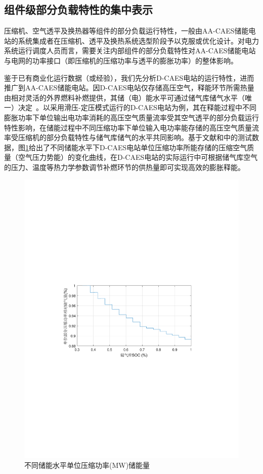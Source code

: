 \subsection{组件级部分负载特性的集中表示}
压缩机、空气透平及换热器等组件的部分负载运行特性，一般由AA-CAES储能电站的系统集成者在压缩机、透平及换热系统选型阶段予以克服或优化设计。对电力系统运行调度人员而言，需要关注内部组件的部分负载特性对AA-CAES储能电站与电网的功率接口（即压缩机的压缩功率与透平的膨胀功率）的整体影响。

鉴于已有商业化运行数据（或经验），我们先分析D-CAES电站的运行特性，进而推广到AA-CAES储能电站。因D-CAES电站仅存储高压空气，释能环节所需热量由相对灵活的外界燃料补燃提供，其储（电）能水平可通过储气库储气水平（唯一）决定~\cite{CAES-Review-18-Rui-operation}。以采用滑压-定压模式运行的D-CAES电站为例，其在释能过程中不同膨胀功率下单位输出电功率消耗的高压空气质量流率受其空气透平的部分负载运行特性影响，在储能过程中不同压缩功率下单位输入电功率能存储的高压空气质量流率受压缩机的部分负载特性与储气库储气的水平共同影响。基于文献和中的测试数据，图\ref{fig:Compression-SOC-Part-Load}给出了不同储能水平下D-CAES电站单位压缩功率所能存储的压缩空气质量（空气压力势能）的变化曲线，在D-CAES电站的实际运行中可根据储气库空气的压力、温度等热力学参数调节补燃环节的供热量即可实现高效的膨胀释能。

\begin{figure}[H] %
  \centering
  \includegraphics[scale=0.80]{figures/Chap1-8-Compression-SOC-Part-Load.pdf}
  \caption{不同储能水平单位压缩功率(MW)储能量}
  \label{fig:Compression-SOC-Part-Load}
\end{figure}

